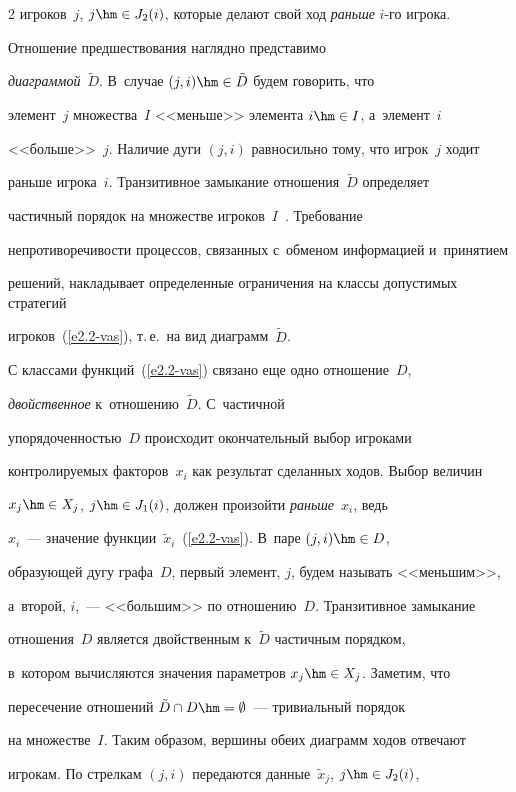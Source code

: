 \begin{multicols}{2}
игроков~$j$, $j\hm\in J_2(i)$, которые делают свой ход \textit{раньше} $i$-го игрока.

Отношение предшествования наглядно представимо

\textit{диаграммой}~$\tilde{D}$. В~случае $(j,i)\hm\in \tilde{D}$ будем говорить, что

элемент~$j$ множества~$I$ <<меньше>> элемента $i\hm\in I$, а~элемент~$i$

<<больше>>~$j$. Наличие дуги $(j,i)$ равносильно тому, что игрок~$j$ ходит

раньше игрока~$i$. Транзитивное замыкание отношения~$\tilde{D}$ определяет

частичный порядок на множестве игроков~$I$~\cite{16-vas}. Требование

непротиворечивости процессов, связанных с~обменом информацией и~принятием

решений, накладывает определенные ограничения на классы допустимых стратегий

игроков~(\ref{e2.2-vas}), т.\,е.\ на вид диаграмм~$\tilde{D}$.



    С классами функций~(\ref{e2.2-vas}) связано еще одно отношение~$D$,

\textit{двойственное} к~отношению~$\tilde{D}$. С~частичной

упорядоченностью~$D$ происходит окончательный выбор игроками

контролируемых факторов~$x_i$ как результат сделанных ходов. Выбор величин

$x_j\hm\in X_j$, $j\hm\in J_1(i)$, должен произойти \textit{раньше}~$x_i$, ведь

$x_i$~--- значение функции~$\tilde{x}_i$~(\ref{e2.2-vas}). В~паре $(j,i)\hm\in D$,

образующей дугу графа~$D$, первый элемент, $j$, будем называть <<меньшим>>,

а~второй, $i$,~--- <<большим>> по отношению~$D$. Транзитивное замыкание

отношения~$D$ является двойственным к~$\tilde{D}$ частичным порядком,

в~котором вычисляются значения параметров $x_j\hm\in X_j$. Заметим, что

пересечение отношений $\tilde{D}\cap D\hm= \emptyset$~--- тривиальный порядок

на множестве~$I$. Таким образом, вершины обеих диаграмм ходов отвечают

игрокам. По стрелкам $(j,i)$ передаются данные~$\tilde{x}_j$, $j\hm\in J_2(i)$,


\end{multicols}
